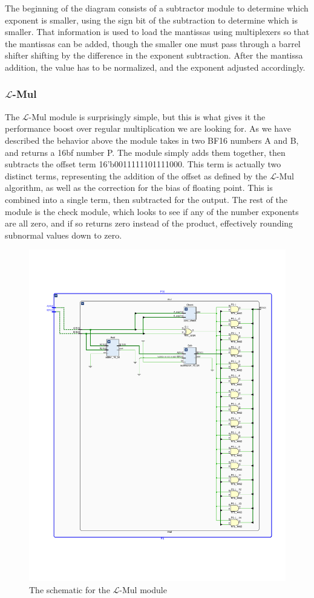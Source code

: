 \documentclass[12pt,letterpaper]{article}
\newcommand{\lmul}{$\mathcal{L}$-Mul\xspace}
\begin{document}
The beginning of the diagram consists of a subtractor module to determine which exponent is smaller, using the sign bit of the subtraction to determine which is smaller.  That information is used to load the mantissas using multiplexers so that the mantissas can be added, though the smaller one must pass through a barrel shifter shifting by the difference in the exponent subtraction.  After the mantissa addition, the value has to be normalized, and the exponent adjusted accordingly.

\subsubsection*{\lmul}

The \lmul module is surprisingly simple, but this is what gives it the performance boost over regular multiplication we are looking for.  As we have described the behavior above the module takes in two BF16 numbers A and B, and returns a 16bf number P.  The module simply adds them together, then subtracts the offset term 16'b0011111101111000.  This term is actually two distinct terms, representing the addition of the offset as defined by the \lmul algorithm, as well as the correction for the bias of floating point.  This is combined into a single term, then subtracted for the output.  The rest of the module is the check module, which looks to see if any of the number exponents are all zero, and if so returns zero instead of the product, effectively rounding subnormal values down to zero.

\begin{figure}[htbp]
    \centering
    \includegraphics[clip, trim=0.5cm 3cm 0.5cm 3cm, width=.85\textwidth]{Verilog Schematics/lmul.pdf}
    \caption{The schematic for the \lmul module}
    \label{fig:lmul}
\end{figure}
\end{document}
